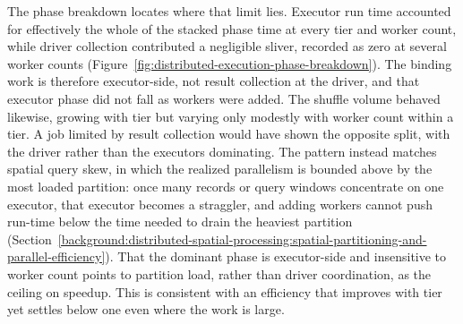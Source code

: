 The phase breakdown locates where that limit lies. Executor run time accounted for effectively the whole of the stacked phase time at every tier and worker count, while driver collection contributed a negligible sliver, recorded as zero at several worker counts (Figure~\ref{fig:distributed-execution-phase-breakdown}). The binding work is therefore executor-side, not result collection at the driver, and that executor phase did not fall as workers were added. The shuffle volume behaved likewise, growing with tier but varying only modestly with worker count within a tier. A job limited by result collection would have shown the opposite split, with the driver rather than the executors dominating. The pattern instead matches spatial query skew, in which the realized parallelism is bounded above by the most loaded partition: once many records or query windows concentrate on one executor, that executor becomes a straggler, and adding workers cannot push run-time below the time needed to drain the heaviest partition \parencite{tang2020_locationspark_distributed_spatial_query,kwon2012_skewtune_mitigating_skew} (Section~\ref{background:distributed-spatial-processing:spatial-partitioning-and-parallel-efficiency}). That the dominant phase is executor-side and insensitive to worker count points to partition load, rather than driver coordination, as the ceiling on speedup. This is consistent with an efficiency that improves with tier yet settles below one even where the work is large.

